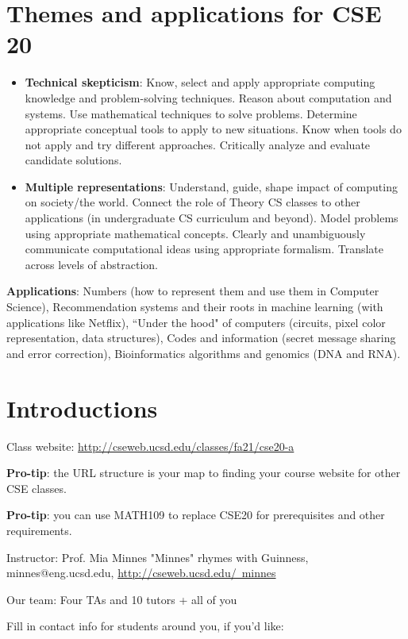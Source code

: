 \section*{Themes and applications for CSE 20}
\begin{itemize}
\item {\bf Technical skepticism}: Know, select and apply appropriate computing knowledge and problem-solving techniques. 
Reason about computation and systems. 
Use mathematical techniques to solve problems. 
Determine appropriate conceptual tools to apply to new situations. 
Know when tools do not apply and try different approaches. 
Critically analyze and evaluate candidate solutions.
\item {\bf Multiple representations}: Understand, guide, shape impact of computing on society/the world. 
Connect the role of Theory CS classes to other applications (in undergraduate CS curriculum and beyond). 
Model problems using appropriate mathematical concepts.
Clearly and unambiguously communicate computational ideas using appropriate formalism. 
Translate across levels of abstraction.
\end{itemize}

{\bf Applications}: Numbers (how to represent them and use them in Computer Science), 
Recommendation systems and their roots in machine learning (with applications like Netflix),
``Under the hood" of computers (circuits, pixel color representation, data structures),
Codes and information (secret message sharing and error correction),
Bioinformatics algorithms and genomics (DNA and RNA).

\section*{Introductions}
Class website: \href{http://cseweb.ucsd.edu/classes/fa21/cse20-a}{http://cseweb.ucsd.edu/classes/fa21/cse20-a}

{\bf Pro-tip}: the URL structure is your map to finding your course website for other CSE classes.

{\bf Pro-tip}: you can use MATH109 to replace CSE20 for prerequisites and other requirements.

Instructor: Prof. Mia Minnes {\tiny{"Minnes" rhymes with Guinness}}, minnes@eng.ucsd.edu, 
\href{http://cseweb.ucsd.edu/~minnes}{http://cseweb.ucsd.edu/~minnes}

Our team: Four TAs and 10 tutors + all of you

Fill in contact info for students around you, if you'd like:
\vspace{50pt}


